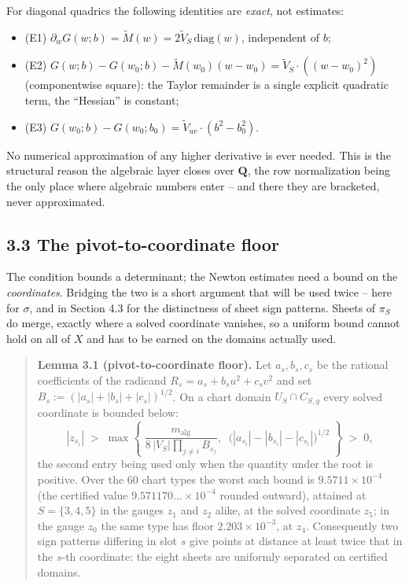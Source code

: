 For diagonal quadrics the following identities are \emph{exact}, not estimates:

\begin{itemize}
\tightlist
\item
  (E1) \(\partial_w G(w; b) = \tilde M(w) = 2 \tilde V_S \,\mathrm{diag}(w)\), independent of \(b\);
\item
  (E2) \(G(w; b) - G(w_0; b) - \tilde M(w_0)(w - w_0)
  = \tilde V_S \cdot ((w - w_0)^2)\) (componentwise square): the Taylor remainder is a single explicit quadratic term, the ``Hessian'' is constant;
\item
  (E3) \(G(w_0; b) - G(w_0; b_0) = \tilde V_{uv} \cdot (b^2 - b_0^2)\).
\end{itemize}

No numerical approximation of any higher derivative is ever needed. This is the structural reason the algebraic layer closes over \(\mathbf{Q}\), the row normalization being the only place where algebraic numbers enter -- and there they are bracketed, never approximated.

\subsection{3.3 The pivot-to-coordinate floor}\label{the-pivot-to-coordinate-floor}

The condition bounds a determinant; the Newton estimates need a bound on the \emph{coordinates}. Bridging the two is a short argument that will be used twice -- here for \(\sigma\), and in Section 4.3 for the distinctness of sheet sign patterns. Sheets of \(\pi_S\) do merge, exactly where a solved coordinate vanishes, so a uniform bound cannot hold on all of \(X\) and has to be earned on the domains actually used.

\begin{quote}
\textbf{Lemma 3.1 (pivot-to-coordinate floor).} Let \(a_s, b_s, c_s\) be the rational coefficients of the radicand \(R_s = a_s + b_s u^2 + c_s v^2\) and set \(B_s := (|a_s| + |b_s| + |c_s|)^{1/2}\). On a chart domain \(U_S \cap C_{S,g}\) every solved coordinate is bounded below: \[|z_{s_i}| \;>\; \max\!\left\{\;
\frac{m_{\mathrm{alg}}}{8\,|V_S| \prod_{j \neq i} B_{s_j}}, \;\;
\big(|a_{s_i}| - |b_{s_i}| - |c_{s_i}|\big)^{1/2} \;\right\} \;>\; 0,\] the second entry being used only when the quantity under the root is positive. Over the \(60\) chart types the worst such bound is \(9.5711 \times 10^{-4}\) (the certified value \(9.571170\ldots \times 10^{-4}\) rounded outward), attained at \(S = \{3,4,5\}\) in the gauges \(z_1\) and \(z_2\) alike, at the solved coordinate \(z_5\); in the gauge \(z_0\) the same type has floor \(2.203 \times 10^{-3}\), at \(z_4\). Consequently two sign patterns differing in slot \(s\) give points at distance at least twice that in the \(s\)-th coordinate: the eight sheets are uniformly separated on certified domains.
\end{quote}

